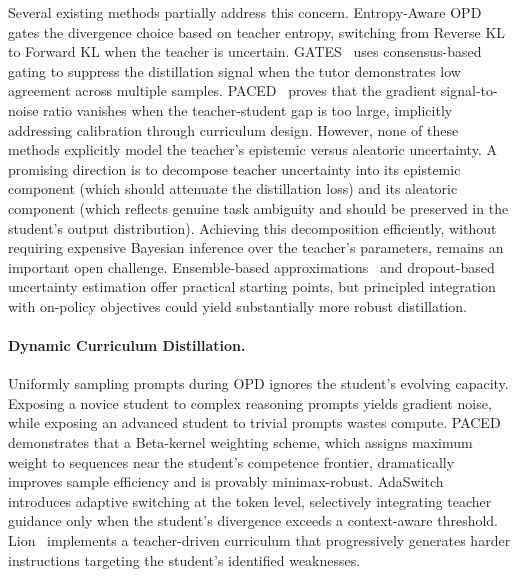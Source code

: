 \documentclass{article} %
\begin{document}
Several existing methods partially address this concern. Entropy-Aware OPD~\citep{2603.07079} gates the divergence choice based on teacher entropy, switching from Reverse KL to Forward KL when the teacher is uncertain. GATES~\citep{2602.20574} uses consensus-based gating to suppress the distillation signal when the tutor demonstrates low agreement across multiple samples. PACED~\citep{2603.11178} proves that the gradient signal-to-noise ratio vanishes when the teacher-student gap is too large, implicitly addressing calibration through curriculum design. However, none of these methods explicitly model the teacher's epistemic versus aleatoric uncertainty. A promising direction is to decompose teacher uncertainty into its epistemic component (which should attenuate the distillation loss) and its aleatoric component (which reflects genuine task ambiguity and should be preserved in the student's output distribution). Achieving this decomposition efficiently, without requiring expensive Bayesian inference over the teacher's parameters, remains an important open challenge. Ensemble-based approximations~\citep{2602.20574} and dropout-based uncertainty estimation offer practical starting points, but principled integration with on-policy objectives could yield substantially more robust distillation.

\paragraph{Dynamic Curriculum Distillation.}
Uniformly sampling prompts during OPD ignores the student's evolving capacity. Exposing a novice student to complex reasoning prompts yields gradient noise, while exposing an advanced student to trivial prompts wastes compute. PACED~\citep{2603.11178} demonstrates that a Beta-kernel weighting scheme, which assigns maximum weight to sequences near the student's competence frontier, dramatically improves sample efficiency and is provably minimax-robust. AdaSwitch~\citep{2510.07842} introduces adaptive switching at the token level, selectively integrating teacher guidance only when the student's divergence exceeds a context-aware threshold. Lion~\citep{2305.12870} implements a teacher-driven curriculum that progressively generates harder instructions targeting the student's identified weaknesses.
\end{document}
